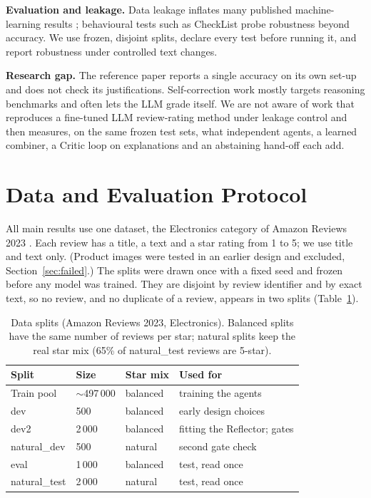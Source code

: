 \documentclass[runningheads]{llncs}
\begin{document}
\textbf{Evaluation and leakage.} Data leakage inflates many published machine-learning results \cite{kapoor2023leakage}; behavioural tests such as CheckList \cite{ribeiro2020checklist} probe robustness beyond accuracy. We use frozen, disjoint splits, declare every test before running it, and report robustness under controlled text changes.

\textbf{Research gap.} The reference paper reports a single accuracy on its own set-up and does not check its justifications. Self-correction work mostly targets reasoning benchmarks and often lets the LLM grade itself. We are not aware of work that reproduces a fine-tuned LLM review-rating method under leakage control and then measures, on the same frozen test sets, what independent agents, a learned combiner, a Critic loop on explanations and an abstaining hand-off each add.

\section{Data and Evaluation Protocol}
\label{sec:data}

All main results use one dataset, the Electronics category of Amazon Reviews 2023 \cite{hou2024}. Each review has a title, a text and a star rating from 1 to 5; we use title and text only. (Product images were tested in an earlier design and excluded, Section~\ref{sec:failed}.) The splits were drawn once with a fixed seed and frozen before any model was trained. They are disjoint by review identifier and by exact text, so no review, and no duplicate of a review, appears in two splits (Table~\ref{tbl:splits}).

\begin{table}[t]
\centering
\caption{Data splits (Amazon Reviews 2023, Electronics). Balanced splits have the same number of reviews per star; natural splits keep the real star mix (65\% of natural\_test reviews are 5-star).}
\label{tbl:splits}
\small
\begin{tabular}{llll}
\toprule
Split & Size & Star mix & Used for \\
\midrule
Train pool & $\sim$497\,000 & balanced & training the agents \\
dev & 500 & balanced & early design choices \\
dev2 & 2\,000 & balanced & fitting the Reflector; gates \\
natural\_dev & 500 & natural & second gate check \\
eval & 1\,000 & balanced & test, read once \\
natural\_test & 2\,000 & natural & test, read once \\
\bottomrule
\end{tabular}
\end{table}
\end{document}
